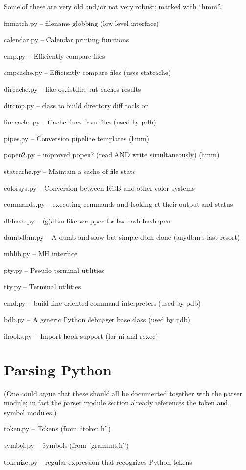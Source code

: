 Some of these are very old and/or not very robust; marked with ``hmm''.

fnmatch.py -- filename globbing (low level interface)

calendar.py -- Calendar printing functions

cmp.py -- Efficiently compare files

cmpcache.py -- Efficiently compare files (uses statcache)

dircache.py -- like os.listdir, but caches results

dircmp.py -- class to build directory diff tools on

linecache.py -- Cache lines from files (used by pdb)

pipes.py -- Conversion pipeline templates (hmm)

popen2.py -- improved popen? (read AND write simultaneously) (hmm)

statcache.py -- Maintain a cache of file stats

colorsys.py -- Conversion between RGB and other color systems

commands.py -- executing commands and looking at their output and
status

dbhash.py -- (g)dbm-like wrapper for bsdhash.hashopen

dumbdbm.py -- A dumb and slow but simple dbm clone (anydbm's last
resort)

mhlib.py -- MH interface

pty.py -- Pseudo terminal utilities

tty.py -- Terminal utilities

cmd.py -- build line-oriented command interpreters (used by pdb)

bdb.py -- A generic Python debugger base class (used by pdb)

ihooks.py -- Import hook support (for ni and rexec)


\section{Parsing Python}

(One could argue that these should all be documented together with the
parser module; in fact the parser module section already references
the token and symbol modules.)

token.py -- Tokens (from ``token.h'')

symbol.py -- Symbols (from ``graminit.h'')

tokenize.py -- regular expression that recognizes Python tokens

